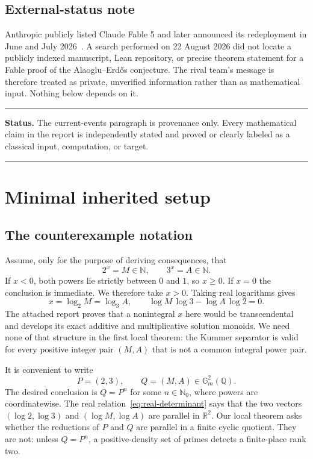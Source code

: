 \documentclass[11pt,oneside]{article}
\theoremstyle{definition}
\theoremstyle{remark}
\newcommand{\N}{\mathbb N}
\newcommand{\Nzero}{\mathbb N_0}
\newcommand{\Q}{\mathbb Q}
\newcommand{\R}{\mathbb R}
\newcommand{\Gm}{\mathbb G_m}
\newcommand{\AEname}{Alaoglu--Erd\H{o}s}
\newenvironment{statusbox}[1]
{\begin{center}\begin{minipage}{0.94\textwidth}\hrule\vspace{0.45em}\textbf{Status.} #1\par\vspace{0.35em}}
{\vspace{0.35em}\hrule\end{minipage}\end{center}}
\begin{document}
\subsection{External-status note}

Anthropic publicly listed Claude Fable 5 and later announced its redeployment in June and
July 2026~\cite{AnthropicFable,AnthropicRedeploy}.  A search performed on 22 August 2026 did
not locate a publicly indexed manuscript, Lean repository, or precise theorem statement for
a Fable proof of the \AEname{} conjecture.  The rival team's message is therefore treated as
private, unverified information rather than as mathematical input.  Nothing below depends on
it.

\begin{statusbox}{The current-events paragraph is provenance only.  Every mathematical claim
in the report is independently stated and proved or clearly labeled as a classical input,
computation, or target.}
\end{statusbox}

\section{Minimal inherited setup}
\label{sec:setup}

\subsection{The counterexample notation}

Assume, only for the purpose of deriving consequences, that
\begin{equation}
  2^x=M\in\N,
  \qquad
  3^x=A\in\N.
  \label{eq:counterexample-pair}
\end{equation}
If $x<0$, both powers lie strictly between $0$ and $1$, so $x\ge0$.  If $x=0$ the conclusion
is immediate.  We therefore take $x>0$.  Taking real logarithms gives
\begin{equation}
  x=\log_2 M=\log_3 A,
  \qquad
  \log M\,\log3-\log A\,\log2=0.
  \label{eq:real-determinant}
\end{equation}
The attached report proves that a nonintegral $x$ here would be transcendental and develops
its exact additive and multiplicative solution monoids.  We need none of that structure in
the first local theorem: the Kummer separator is valid for every positive integer pair
$(M,A)$ that is not a common integral power pair.

It is convenient to write
\[
 P=(2,3),\qquad Q=(M,A)\in \Gm^2(\Q).
\]
The desired conclusion is $Q=P^n$ for some $n\in\Nzero$, where powers are coordinatewise.
The real relation~\eqref{eq:real-determinant} says that the two vectors
$(\log2,\log3)$ and $(\log M,\log A)$ are parallel in $\R^2$.  Our local theorem asks whether
the reductions of $P$ and $Q$ are parallel in a finite cyclic quotient.  They are not: unless
$Q=P^n$, a positive-density set of primes detects a finite-place rank two.
\end{document}
